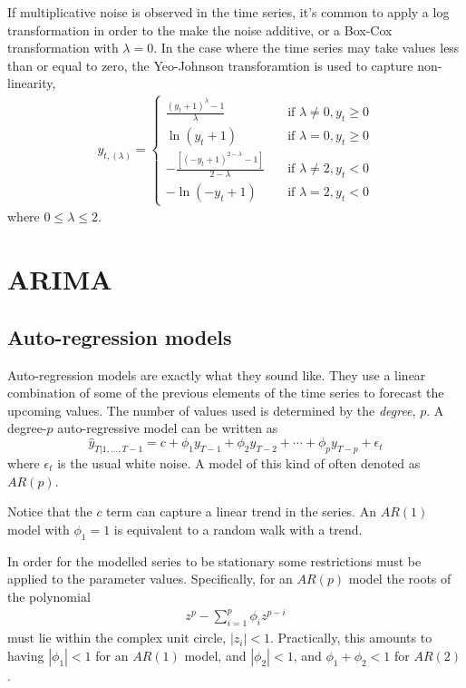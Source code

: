 \documentclass[a4paper,12pt]{article}
\theoremstyle{definition}
\newcommand{\modu}[1]{\left| #1 \right|} %
\begin{document}
If multiplicative noise is observed in the time series, it's common to apply a log transformation in order to the make the noise additive, or a Box-Cox transformation with $\lambda = 0$. In the case where the time series may take values less than or equal to zero, the Yeo-Johnson transforamtion is used to capture non-linearity,
\begin{align}
	y_{t, (\lambda)} = \begin{cases}
					\frac{(y_t + 1)^\lambda - 1}{\lambda} &\quad \text{if } \lambda \neq 0, y_t \geq 0 \\
					\ln(y_t + 1) &\quad \text{if } \lambda = 0, y_t \geq 0 \\
					-\frac{[(-y_t + 1)^{2-\lambda}-1]}{2-\lambda} &\quad \text{if } \lambda \neq 2, y_t < 0 \\
					-\ln(-y_t + 1) &\quad \text{if } \lambda = 2, y_t < 0
				\end{cases}
\end{align}
where $0 \leq \lambda \leq 2$. 

\section{ARIMA}
\subsection{Auto-regression models}
Auto-regression models are exactly what they sound like. They use a linear combination of some of the previous elements of the time series to forecast the upcoming values. The number of values used is determined by the \textit{degree}, $p$. A degree-$p$ auto-regressive model can be written as
\begin{equation}\label{eq:ar_model}
	\hat{y}_{T|1, \dots, T-1} = c + \phi_1 y_{T-1} + \phi_2 y_{T-2} + \cdots + \phi_p y_{T-p} + \epsilon_t
\end{equation}
where $\epsilon_t$ is the usual white noise. A model of this kind of often denoted as $AR(p)$.

Notice that the $c$ term can capture a linear trend in the series. An $AR(1)$ model with $\phi_1 = 1$ is equivalent to a random walk with a trend.

In order for the modelled series to be stationary some restrictions must be applied to the parameter values. Specifically, for an $AR(p)$ model the roots of the polynomial
\begin{align}
	z^p - \sum_{i=1}^{p} \phi_{i}z^{p-i}
\end{align}
must lie within the complex unit circle, $\modu{z_i} < 1$. Practically, this amounts to having $\modu{\phi_1}<1$ for an $AR(1)$ model, and $\modu{\phi_2}<1$, and $\phi_1 + \phi_2 <1$ for $AR(2)$.
\end{document}
